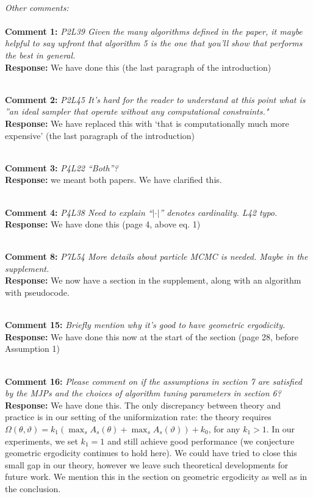 \documentclass[11pt]{article}
\newcommand{\rev}[2]{\textbf{Comment #1: }\emph{#2}}
\newcommand{\resp}{\textbf{Response: }}
\begin{document}
~\\
{\emph{Other comments: }}\\~\\
\noindent \rev{1}{P2L39 Given the many algorithms defined in the paper, it maybe helpful to say upfront that algorithm 5 is the one that you’ll show that performs the best in general.}\\
\resp We have done this (the last paragraph of the introduction)

~\\
\noindent \rev{2}{P2L45 It’s hard for the reader to understand at this point what is ”an ideal sampler that operate without any computational constraints."}\\
\resp We have replaced this with `that is computationally much more expensive' (the last paragraph of the introduction)

~\\
\noindent \rev{3}{P4L22 “Both”?} \\
\resp{we meant both papers. We have clarified this.}

~\\
\noindent \rev{4}{P4L38 Need to explain “$| \cdot |$” denotes cardinality. L42 typo.} \\
\resp We have done this (page 4, above eq. 1)

~\\
\noindent \rev{8}{P7L54 More details about particle MCMC is needed. Maybe in the supplement.} \\
\resp We now have a section in the supplement, along with an algorithm with pseudocode.

~\\
\noindent \rev{15}{Briefly mention why it’s good to have geometric ergodicity.} \\
\resp We have done this now at the start of the section (page 28, before Assumption 1) 

~\\
\noindent \rev{16}{Please comment on if the assumptions in section 7 are satisfied by the MJPs and the
choices of algorithm tuning parameters in section 6?}\\
\resp{We have done this. The only discrepancy between theory and practice is in our setting of the uniformization rate: the theory requires $\Omega(\theta,\vartheta) = k_1 (\max_s A_s(\theta) + \max_s A_s(\vartheta)) + k_0$, for any $k_1 > 1$. In our experiments, we set $k_1 = 1$ and still achieve good performance (we conjecture geometric ergodicity continues to hold here). We could have tried to close this small gap in our theory, however we leave such theoretical developments for future work. We mention this in the section on geometric ergodicity as well as in the conclusion.}
\end{document}
